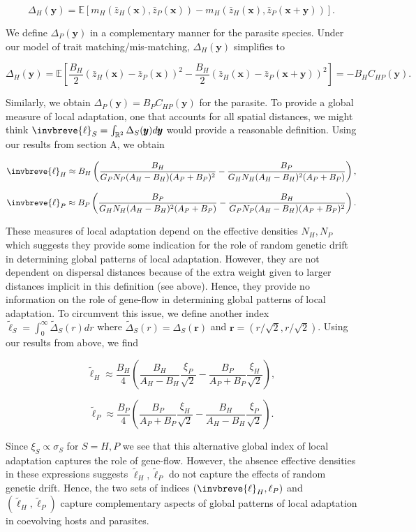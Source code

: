 \documentclass{article}
\begin{document}
\[\Delta_H(\pmb y)=\mathbb E[m_H(\bar z_H(\pmb x),\bar z_P(\pmb x))-m_H(\bar z_H(\pmb x),\bar z_P(\pmb x+\pmb y))].\]

We define \(\Delta_P(\pmb y)\) in a complementary manner for the
parasite species. Under our model of trait matching/mis-matching,
\(\Delta_H(\pmb y)\) simplifies to

\[\Delta_H(\pmb y)=\mathbb E\left[\frac{B_H}{2}\left(\bar z_H(\pmb x)-\bar z_P(\pmb x)\right)^2-\frac{B_H}{2}\left(\bar z_H(\pmb x)-\bar z_P(\pmb x+\pmb y)\right)^2\right]=-B_HC_{HP}(\pmb y).\]

Similarly, we obtain \(\Delta_P(\pmb y)=B_PC_{HP}(\pmb y)\) for the
parasite. To provide a global measure of local adaptation, one that
accounts for all spatial distances, we might think
\(\invbreve{\ell}_S=\int_{\mathbb R^2}\Delta_S(\pmb y)d\pmb y\) would
provide a reasonable definition. Using our results from section A, we
obtain

\[\invbreve{\ell}_H\approx B_H\left(\frac{B_H}{G_PN_P(A_H-B_H)(A_P+B_P)^2}-\frac{B_P}{G_HN_H(A_H-B_H)^2(A_P+B_P)}\right),\]

\[\invbreve{\ell}_P\approx B_P\left(\frac{B_P}{G_HN_H(A_H-B_H)^2(A_P+B_P)}-\frac{B_H}{G_PN_P(A_H-B_H)(A_P+B_P)^2}\right).\]

These measures of local adaptation depend on the effective densities
\(N_H,N_P\) which suggests they provide some indication for the role of
random genetic drift in determining global patterns of local adaptation.
However, they are not dependent on dispersal distances because of the
extra weight given to larger distances implicit in this definition (see
above). Hence, they provide no information on the role of gene-flow in
determining global patterns of local adaptation. To circumvent this
issue, we define another index
\(\tilde{\ell}_S=\int_0^\infty\tilde\Delta_S(r)dr\) where
\(\tilde\Delta_S(r)=\Delta_S(\pmb r)\) and
\(\pmb r=(r/\sqrt2,r/\sqrt2)\). Using our results from above, we find

\[\tilde{\ell}_H\approx\frac{B_H}{4}\left(\frac{B_H}{A_H-B_H}\frac{\xi_P}{\sqrt2}-\frac{B_P}{A_P+B_P}\frac{\xi_H}{\sqrt2}\right),\]

\[\tilde{\ell}_P\approx\frac{B_P}{4}\left(\frac{B_P}{A_P+B_P}\frac{\xi_H}{\sqrt2}-\frac{B_H}{A_H-B_H}\frac{\xi_P}{\sqrt2}\right).\]

Since \(\xi_S\propto\sigma_S\) for \(S=H,P\) we see that this
alternative global index of local adaptation captures the role of
gene-flow. However, the absence effective densities in these expressions
suggests \(\tilde{\ell}_H,\tilde{\ell}_P\) do not capture the effects of
random genetic drift. Hence, the two sets of indices
\((\invbreve{\ell}_H,{\ell}_P)\) and \((\tilde{\ell}_H,\tilde{\ell}_P)\)
capture complementary aspects of global patterns of local adaptation in
coevolving hosts and parasites.
\end{document}
